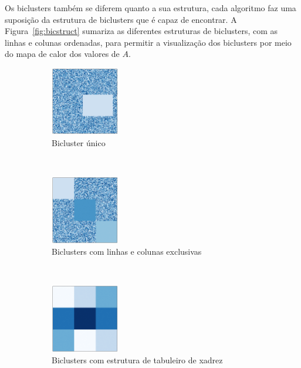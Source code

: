 \documentclass[normaltoc, espacoumemeio, pnumromarab,ruledheader]{abnt}
\begin{document}
    Os biclusters também se diferem quanto a sua estrutura, cada algoritmo faz uma suposição da estrutura de biclusters que é capaz de encontrar. A Figura~\ref{fig:bicstruct} sumariza as diferentes estruturas de biclusters, com as linhas e colunas ordenadas, para permitir a visualização dos biclusters por meio do mapa de calor dos valores de $A$.

    \begin{figure}[h]
        \centering
        \begin{subfigure}[b]{0.3\textwidth}
                \includegraphics[width=30mm]{img/a-bic-struct.png}
                \caption{Bicluster único}
                \label{fig:bicstruct-a}
        \end{subfigure}
        ~
        \centering
        \begin{subfigure}[b]{0.3\textwidth}
                \includegraphics[width=30mm]{img/b-bic-struct.png}
                \caption{Biclusters com linhas e colunas exclusivas}
                \label{fig:bicstruct-b}
        \end{subfigure}
        ~
        \centering
        \begin{subfigure}[b]{0.3\textwidth}
                \includegraphics[width=30mm]{img/c-bic-struct.png}
                \caption{Biclusters com estrutura de tabuleiro de xadrez}
                \label{fig:bicstruct-c}
        \end{subfigure}
        ~
        \centering
        \begin{subfigure}[b]{0.3\textwidth}

\end{subfigure}
\end{figure}
\end{document}

